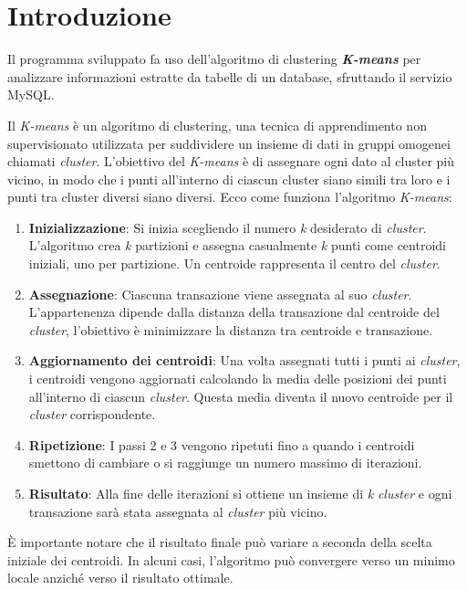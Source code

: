 \section{Introduzione}

Il programma sviluppato fa uso dell'algoritmo di clustering \textbf{\textit{K-means}} per analizzare informazioni estratte da tabelle di un database, sfruttando il servizio MySQL.

Il \textit{K-means} è un algoritmo di clustering, una tecnica di apprendimento non supervisionato utilizzata per suddividere un insieme di dati in gruppi omogenei chiamati \textit{cluster}. 
L'obiettivo del \textit{K-means} è di assegnare ogni dato al cluster più vicino, in modo che i punti all'interno di ciascun cluster siano simili tra loro e i punti tra cluster diversi siano diversi. 
Ecco come funziona l'algoritmo \textit{K-means}: 
\begin{enumerate}
  \item \textbf{Inizializzazione}: Si inizia scegliendo il numero \textit{k} desiderato di \textit{cluster}. L'algoritmo crea \textit{k} partizioni e assegna casualmente \textit{k} punti come centroidi iniziali, uno per partizione. Un centroide rappresenta il centro del \textit{cluster}.
  \item \textbf{Assegnazione}: Ciascuna transazione viene assegnata al suo \textit{cluster}. L'appartenenza  dipende dalla distanza della transazione dal centroide del \textit{cluster}, l'obiettivo è minimizzare la distanza tra centroide e transazione.
  \item \textbf{Aggiornamento dei centroidi}: Una volta assegnati tutti i punti ai \textit{cluster}, i centroidi vengono aggiornati calcolando la media delle posizioni dei punti all'interno di ciascun \textit{cluster}. Questa media diventa il nuovo centroide per il \textit{cluster} corrispondente.
  \item \textbf{Ripetizione}: I passi 2 e 3 vengono ripetuti fino a quando i centroidi smettono di cambiare o si raggiunge un numero massimo di iterazioni.
  \item \textbf{Risultato}: Alla fine delle iterazioni si ottiene un insieme di \textit{k} \textit{cluster} e ogni transazione sarà stata assegnata al \textit{cluster} più vicino.
\end{enumerate}

\noindent È importante notare che il risultato finale può variare a seconda della scelta iniziale dei centroidi. In alcuni casi, l'algoritmo può convergere verso un minimo locale anziché verso il risultato ottimale. 